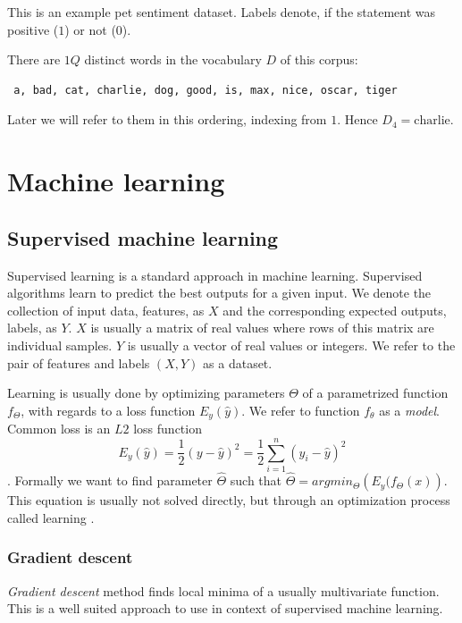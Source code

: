         This is an example pet sentiment dataset. Labels denote, if the statement was positive ($1$) or not ($0$).
        
        There are $1Q$ distinct words in the vocabulary $D$ of this corpus: 
        \begin{verbatim} a, bad, cat, charlie, dog, good, is, max, nice, oscar, tiger \end{verbatim}
        
        Later we will refer to them in this ordering, indexing from $1$. Hence $D_4=\mathrm{charlie}$.
    
    \section{Machine learning}
    
        \subsection{Supervised machine learning}
        Supervised learning is a standard approach in machine learning. 
        Supervised algorithms learn to predict the best outputs for a given input.
        We denote the collection of input data, features, as $X$ and the corresponding expected outputs, labels, as $Y$.
        $X$ is usually a matrix of real values where rows of this matrix are individual samples.
        $Y$ is usually a vector of real values or integers. 
        We refer to the pair of features and labels $(X, Y)$ as a dataset.
        
        Learning is usually done by optimizing parameters $\Theta$ of a parametrized function $f_\Theta$,
        with regards to a loss function $E_y(\hat{y})$. 
        We refer to function $f_\theta$ as a \textit{model}.
        Common loss is an $L2$ loss function $$E_y(\hat{y}) = \frac{1}{2}(y - \hat{y})^2 = \frac{1}{2}\sum_{i=1}^n (y_i - \hat{y})^2$$.  
        Formally we want to find parameter $\hat{\Theta}$ such that $\hat{\Theta} = argmin_\Theta \left(E_y(f_\Theta(x) \right)$. 
        This equation is usually not solved directly, but through an optimization process called learning \cite{Goodfellow-et-al-2016}. %
        
        \subsubsection{Gradient descent}

        \textit{Gradient descent} method finds local minima of a usually multivariate function. 
        This is a well suited approach to use in context of supervised machine learning. 
        
